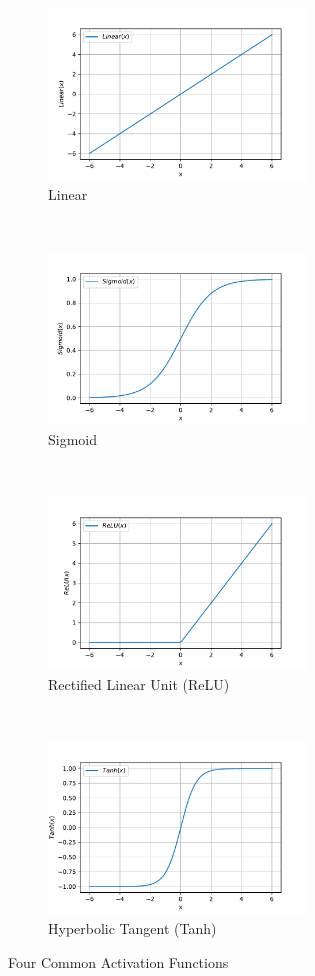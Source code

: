 \begin{spacing}{1.5}
\begin{figure}[th]
    \centering
    \begin{subfigure}[b]{0.49\textwidth}
        \centering
        \includegraphics[width=2.7in, fbox]{Chapter2/linear.pdf}
        \caption{Linear}
    \end{subfigure}%
    ~
    \begin{subfigure}[b]{0.49\textwidth}
        \centering
        \includegraphics[width=2.7in, fbox]{Chapter2/sigmoid.pdf}
        \caption{Sigmoid}
    \end{subfigure}
    \\
    \begin{subfigure}[b]{0.49\textwidth}
        \centering
        \includegraphics[width=2.7in, fbox]{Chapter2/ReLu.pdf}
        \caption{Rectified Linear Unit (ReLU)}
    \end{subfigure}%
    ~
    \begin{subfigure}[b]{0.49\textwidth}
        \centering
        \includegraphics[width=2.7in, fbox]{Chapter2/tanh.pdf}
        \caption{Hyperbolic Tangent (Tanh)}
        \label{fig:tanhfunc} 
    \end{subfigure}
    \caption{Four Common Activation Functions}
    \label{fig:activationfunc} 
\end{figure}


\end{spacing}
